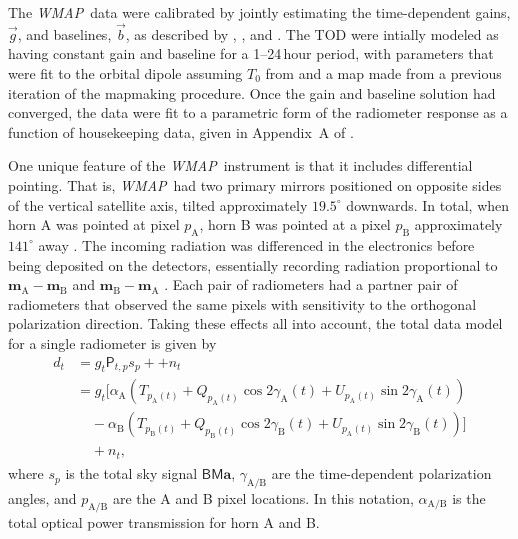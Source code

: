 \documentclass[twocolumn]{../../common/aa}
\def\WMAP{\emph{WMAP}}
\newcommand{\A}[0]{\mathrm{A}}
\newcommand{\B}[0]{\mathrm{B}}
\newcommand{\bv}[0]{\vec{b}}
\newcommand{\g}[0]{\vec{g}}
\begin{document}
The \WMAP\ data were calibrated by jointly estimating the time-dependent gains, $\g$, and baselines, $\bv$, as described by \citet{hinshaw2007}, \citet{hinshaw2009}, and \citet{jarosik2010}.
The TOD were intially modeled as having
constant gain and baseline for a 1--24\,hour period, with parameters that were fit to the orbital
dipole assuming $T_0$ from \citet{mather:1999} and a map made from a previous
iteration of the mapmaking procedure. Once the gain and baseline solution had
converged, the data were fit to a parametric form of the radiometer response
as a function of housekeeping data, given in Appendix~A of \citet{wmapexsupp}.

One unique feature of the \WMAP\ instrument is that it includes differential pointing. That is, \WMAP\ had two primary mirrors positioned on opposite sides of the vertical satellite axis, tilted approximately $19.5^\circ$ downwards. In total, when horn A was pointed at pixel $p_\A$, horn B was pointed at a pixel $p_\B$ approximately $141^\circ$ away \citep{page2003:MAP}. The incoming radiation was differenced in the electronics before being deposited on the detectors, essentially recording radiation proportional to $\boldsymbol m_\A-\boldsymbol m_\B$ and $\boldsymbol m_\B-\boldsymbol m_\A$ \citep{jarosik2003:MAP}. Each pair of radiometers had a partner pair of radiometers that observed the same pixels with sensitivity to the orthogonal polarization direction. Taking these effects all into account, the total data model for a single radiometer is given by
\begin{align}
	d_{t}&=g_{t}\mathsf P_{t,p}s_{p} + +n_t
	\\
	&=g_t\Big[\alpha_\A(T_{p_\A(t)}+Q_{p_\A(t)}\cos2\gamma_\A(t) + U_{p_\A(t)}\sin2\gamma_\A(t))
	\nonumber
	\\
	&\phantom{g_t\Big[}-
	\alpha_\B(T_{p_\B(t)}+Q_{p_\B(t)}\cos2\gamma_\B(t) + U_{p_\A(t)}\sin2\gamma_\B(t))\Big]
	\nonumber
	\\
	&\phantom{g_t\Big[}
	+n_t,
\end{align}
where $s_p$ is the total sky signal $\mathsf B\mathsf M\boldsymbol a$, $\gamma_{\A/\B}$ are the time-dependent polarization angles, and $p_{\A/\B}$ are the A and B pixel locations. In this notation, $\alpha_{\A/\B}$ is the total optical power transmission for horn A and B.
\end{document}
